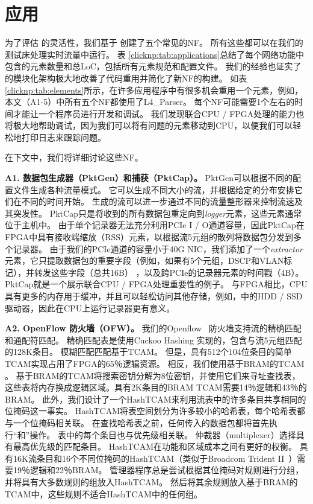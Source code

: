 \section{应用}
\label{clicknp:sec:application}

为了评估 \name 的灵活性，我们基于 \name 创建了五个常见的NF。
所有这些都可以在我们的测试床处理实时流量中运行。
表 \ref {clicknp:tab:applications}总结了每个网络功能中包含的元素数量和总LoC，包括所有元素规范和配置文件。
我们的经验也证实了\name 的模块化架构极大地改善了代码重用并简化了新NF的构建。
如表 \ref {clicknp:tab:elements}所示，在许多应用程序中有很多机会重用一个元素，例如，本文（A1-5）中所有五个NF都使用了L4\_Parser。
每个NF可能需要1个左右的时间才能让一个程序员进行开发和调试。
我们发现联合CPU / FPGA处理的能力也将极大地帮助调试，因为我们可以将有问题的元素移动到CPU，以便我们可以轻松地打印日志来跟踪问题。

在下文中，我们将详细讨论这些NF。

\textbf {A1. 数据包生成器（PktGen）和捕获（PktCap）。}
PktGen可以根据不同的配置文件生成各种流量模式。
它可以生成不同大小的流，并根据给定的分布安排它们在不同的时间开始。
生成的流可以进一步通过不同的流量整形器来控制流速及其突发性。
PktCap只是将收到的所有数据包重定向到\textit {logger}元素，这些元素通常位于主机中。
由于单个记录器无法充分利用PCIe I / O通道容量，因此PktCap在FPGA中具有接收端缩放（RSS）元素，以根据流5元组的散列将数据包分发到多个记录器。
由于我们的PCIe通道的容量小于40G NIC，我们添加了一个\textit {extractor}元素，它只提取数据包的重要字段（例如，如果有5个元组，DSCP和VLAN标记），并转发这些字段（总共16B） ，以及跨PCIe的记录器元素的时间戳（4B）。
PktCap就是一个展示联合CPU / FPGA处理重要性的例子。
与FPGA相比，CPU具有更多的内存用于缓冲，并且可以轻松访问其他存储，例如，\cite{lee2015flosis}中的HDD / SSD驱动器，因此在CPU上运行记录器更有意义。


\textbf {A2. OpenFlow 防火墙（OFW）。}
我们的Openflow~\cite {mckeown2008openflow} 防火墙支持流的精确匹配和通配符匹配。
精确匹配表是使用Cuckoo Hashing \cite{cuckoo} 实现的，包含与流5元组匹配的128K条目。
模糊匹配匹配基于TCAM。
	但是，具有512个104位条目的简单TCAM实现占用了FPGA的65％逻辑资源。
	相反，我们使用基于BRAM的TCAM \cite {jiang2013scalable}。
	基于BRAM的TCAM将搜索密钥分解为8位密钥，并使用它们来寻址查找表，这些表将内存换成逻辑区域。具有2K条目的BRAM TCAM需要14％逻辑和43％的BRAM。
	此外，我们设计了一个HashTCAM来利用流表中的许多条目共享相同的位掩码这一事实。
	HashTCAM将表空间划分为许多较小的哈希表，每个哈希表都与一个位掩码相关联。
	在查找哈希表之前，任何传入的数据包都将首先执行“和”操作。
	表中的每个条目也与优先级相关联。
	仲裁器（multiplexer）选择具有最高优先级的匹配条目。
	HashTCAM在功能和区域成本之间有更好的权衡。
	具有16K流条目和16个不同位掩码的HashTCAM（类似于Broadcom Trident II~\cite {broadcomethernet}）需要19％逻辑和22％BRAM。
	管理器程序总是尝试根据其位掩码对规则进行分组，并将具有大多数规则的组放入HashTCAM。
	然后将其余规则放入基于BRAM的TCAM中，这些规则不适合HashTCAM中的任何组。



